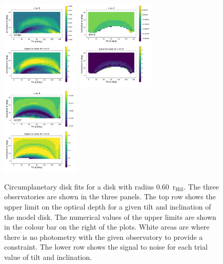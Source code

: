 \documentclass[longauth]{aa} %
\newcommand{\rhill}{$\mathrm{r_{Hill}}$} %
\begin{document}
\begin{figure}[htb]
    \includegraphics[width=0.333\textwidth]{diskfit_BRING_060.pdf}
    \includegraphics[width=0.333\textwidth]{diskfit_BRITE_060.pdf}
    \includegraphics[width=0.333\textwidth]{diskfit_ASTEP_060.pdf}
    \caption{Circumplanetary disk fits for a disk with radius 0.60\ \rhill. The three observatories are shown in the three panels. The top row shows the upper limit on the optical depth for a given tilt and inclination of the model disk. The numerical values of the upper limits are shown in the colour bar on the right of the plots. White areas are where there is no photometry with the given observatory to provide a constraint. The lower row shows the signal to noise for each trial value of tilt and inclination.}
    \label{cpd60}
\end{figure}
\end{document}
